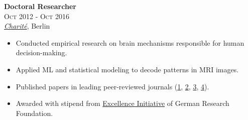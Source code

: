 \documentclass[a4paper,9.5pt]{article}
\begin{document}
\begin{minipage}[t]{0.65\textwidth}
\textbf{Doctoral Researcher}\\
\textsc{Oct 2012 - Oct 2016}\\
\emph{\href{https://mindandbrain.charite.de/en}{Charité}}, Berlin
\vspace{1mm}
\begin{itemize}[leftmargin=1em, itemsep=1mm, parsep=0.5mm]
  \item Conducted empirical research on brain mechanisms responsible for human decision-making.
  \item Applied ML and statistical modeling to decode patterns in MRI images.
  \item Published papers in leading peer-reviewed journals (\href{https://doi.org/10.1093/scan/nsab125}{1}, \href{ https://doi.org/10.1111/acer.14812}{2}, \href{https://doi.org/10.1093/scan/nst110}{3}, \href{https://doi.org/10.1093/scan/nsw036}{4}).
  \item Awarded with stipend from \href{https://www.dfg.de/en/research_funding/programmes/excellence_initiative/index.html}{Excellence Initiative} of German Research Foundation.
\end{itemize}

\end{minipage}
\end{document}
